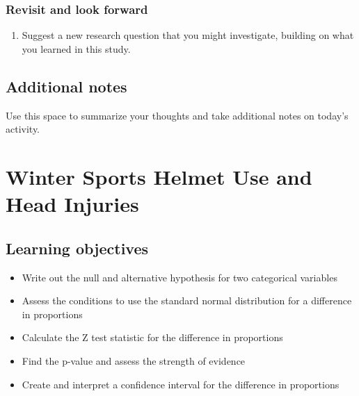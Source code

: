 \documentclass[
]{report}
\providecommand{\tightlist}{%
  \setlength{\itemsep}{0pt}\setlength{\parskip}{0pt}}
\begin{document}
\vspace{3in}

\hypertarget{revisit-and-look-forward}{%
\subsection{Revisit and look forward}\label{revisit-and-look-forward}}

\begin{enumerate}
\def\labelenumi{\arabic{enumi}.}
\setcounter{enumi}{29}
\tightlist
\item
  Suggest a new research question that you might investigate, building on what you learned in this study.
\end{enumerate}

\vspace{1in}

\hypertarget{additional-notes}{%
\section{Additional notes}\label{additional-notes}}

Use this space to summarize your thoughts and take additional notes on today's activity.

\hypertarget{winter-sports-helmet-use-and-head-injuries}{%
\chapter{Winter Sports Helmet Use and Head Injuries}\label{winter-sports-helmet-use-and-head-injuries}}

\hypertarget{learning-objectives}{%
\section{Learning objectives}\label{learning-objectives}}

\begin{itemize}
\item
  Write out the null and alternative hypothesis for two categorical variables
\item
  Assess the conditions to use the standard normal distribution for a difference in proportions
\item
  Calculate the Z test statistic for the difference in proportions
\item
  Find the p-value and assess the strength of evidence
\item
  Create and interpret a confidence interval for the difference in proportions
\end{itemize}
\end{document}

